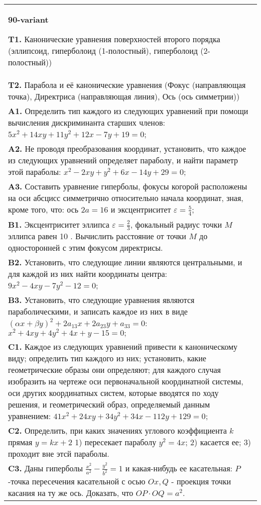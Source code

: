 \documentclass{article}
\begin{document}
\begin{tabular}{m{17cm}}
\textbf{90-variant}
\newline

\textbf{T1.} Канонические уравнения поверхностей второго порядка (эллипсоид, гиперболоид (1-полостный), гиперболоид (2-полостный)) \\
\textbf{T2.} Парабола и её канонические уравнения (Фокус (направляющая точка), Директриса (направляющая линия), Ось (ось симметрии)) \\
\textbf{A1.} Определить тип каждого из следующих уравнений при помощи вычисления дискриминанта старших членов: $5 x^2+14 x y+11 y^2+12 x-7 y+19=0$; \\
\textbf{A2.} Не проводя преобразования координат, установить, что каждое из следующих уравнений определяет параболу, и найти параметр этой параболы: $x^2-2 x y+y^2+6 x-14 y+29=0$; \\
\textbf{A3.} Составить уравнение гиперболы, фокусы когорой расположены на оси абсцисс симметрично относительно начала координат, зная, кроме того, что: ось $2 a=16$ и эксцентриситет $\varepsilon=\frac{5}{4}$; \\
\textbf{B1.} Эксцентриситет эллипса $\varepsilon=\frac{2}{3}$, фокальный радиус точки $M$ эллипса равен 10 . Вычислить расстояние от точки $M$ до односторонней с этим фокусом директрисы. \\
\textbf{B2.} Установить, что следующие линии являются центральными, и для каждой из них найти координаты центра: $9 x^2-4 x y-7 y^2-12=0$; \\
\textbf{B3.} Установить, что следующие уравнения являются параболическими, и записать каждое из них в виде $(\alpha x+\beta y)^2+2 a_{13} x+2 a_{23} y+a_{33}=0$: $x^2+4 x y+4 y^2+4 x+y-15=0 ;$ \\
\textbf{C1.} Каждое из следующих уравнений привести к каноническому виду; определить тип каждого из них; установить, какие геометрические образы они определяют; для каждого случая изобразить на чертеже оси первоначальной координатной системы, оси других координатных систем, которые вводятся по ходу решения, и геометрический образ, определяемый данным уравнением: $41 x^2+24 x y+34 y^2+34 x-112 y+129=0$; \\
\textbf{C2.} Определить, при каких значениях углового коэффициента $k$ прямая $y=k x+2$ 1) пересекает параболу $y^2=4 x$; 2) касается ее; 3) проходит вне этсй параболы. \\
\textbf{C3.} Даны гиперболы $\frac{x^2}{a^2}-\frac{y^2}{b^2}=1$ и какая-нибудь ее касательная: $P$-точка пересечения касательной с осью $O x, Q$ - проекция точки касания на ту же ось. Доказать, что $O P \cdot O Q=a^2$. \\

\end{tabular}
\vspace{1cm}
\end{document}
